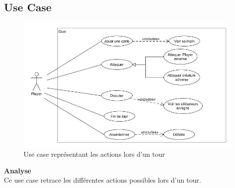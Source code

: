 \subsection{Use Case}
{
\begin{figure}[H]
    \includegraphics[width=1\textwidth,height=1\textwidth]{Images/UseCaseDuel.jpg}
    \caption{\label{Use Case}Use case représentant les actions lors d'un tour}
\end{figure}
\noindent\textbf{Analyse}\\
Ce use case retrace les différentes actions possibles lors d'un tour.

}
